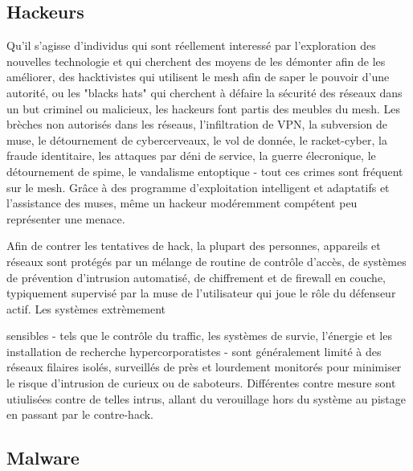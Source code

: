 \subsection{Hackeurs} 

Qu'il s'agisse d'individus qui sont réellement interessé par l'exploration des nouvelles technologie et qui cherchent des moyens de les démonter afin de les améliorer, des hacktivistes qui utilisent le mesh afin de saper le pouvoir d'une autorité, ou les "blacks hats" qui cherchent à défaire la sécurité des réseaux dans un but criminel ou malicieux, les hackeurs font partis des meubles du mesh. Les brèches non autorisés dans les réseaus, l'infiltration de VPN, la subversion de muse, le détournement de cybercerveaux, le vol de donnée, le racket-cyber, la fraude identitaire, les attaques par déni de service, la guerre élecronique, le détournement de spime, le vandalisme entoptique - tout ces crimes sont fréquent sur le mesh. Grâce à des programme d'exploitation intelligent et adaptatifs et l'assistance des muses, même un hackeur modéremment compétent peu représenter une menace. 

Afin de contrer les tentatives de hack, la plupart des personnes, appareils et réseaux sont protégés par un mélange de routine de contrôle d'accès, de systèmes de prévention d'intrusion automatisé, de chiffrement et de firewall en couche, typiquement supervisé par la muse de l'utilisateur qui joue le rôle du défenseur actif. Les systèmes extrèmement 

sensibles - tels que le contrôle du traffic, les systèmes de survie, l'énergie et les installation de recherche hypercorporatistes - sont généralement limité à des réseaux filaires isolés, surveillés de près et lourdement monitorés pour minimiser le risque d'intrusion de curieux ou de saboteurs. Différentes contre mesure sont utiulisées contre de telles intrus, allant du verouillage hors du système au pistage en passant par le contre-hack. 

\subsection{Malware} 

